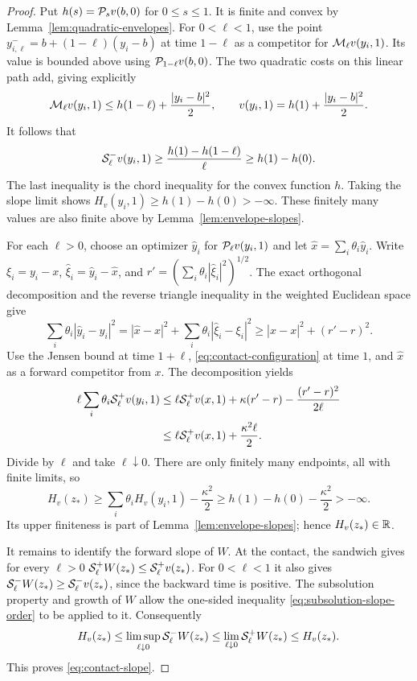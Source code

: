 \begin{proof}
Put $h(s)=\mathcal{P}_s v(b,0)$ for $0\le s\le1$. It is finite and
convex by Lemma~\ref{lem:quadratic-envelopes}. For
$0<\ell<1$, use the point
$y_{i,\ell}^-=b+(1-\ell)(y_i-b)$ at time $1-\ell$ as a competitor for
$\mathcal{M}_\ell v(y_i,1)$. Its value is bounded above using
$\mathcal{P}_{1-\ell}v(b,0)$. The two quadratic costs on this linear
path add, giving explicitly
\[
  \mathcal{M}_\ell v(y_i,1)
      \le h(1-\ell)+\frac{|y_i-b|^2}{2},
  \qquad
  v(y_i,1)=h(1)+\frac{|y_i-b|^2}{2}.
\]
It follows that
\[
  \mathcal{S}_\ell^-v(y_i,1)
     \ge\frac{h(1)-h(1-\ell)}{\ell}
     \ge h(1)-h(0).
\]
The last inequality is the chord inequality for the convex
function $h$. Taking the slope limit shows
$H_v(y_i,1)\ge h(1)-h(0)>-\infty$. These finitely many values
are also finite above by Lemma~\ref{lem:envelope-slopes}.

For each $\ell>0$, choose an optimizer $\widehat y_i$ for
$\mathcal{P}_\ell v(y_i,1)$ and let
$\widehat x=\sum_i\theta_i\widehat y_i$. Write
$\xi_i=y_i-x$, $\widehat\xi_i=\widehat y_i-\widehat x$, and
$r'=(\sum_i\theta_i|\widehat\xi_i|^2)^{1/2}$. The exact
orthogonal decomposition and the reverse triangle inequality
in the weighted Euclidean space give
\[
  \sum_i\theta_i|\widehat y_i-y_i|^2
    =|\widehat x-x|^2+
        \sum_i\theta_i|\widehat\xi_i-\xi_i|^2
    \ge|\widehat x-x|^2+(r'-r)^2.
\]
Use the Jensen bound at time $1+\ell$,
\eqref{eq:contact-configuration} at time $1$, and
$\widehat x$ as a forward competitor from $x$. The
decomposition yields
\begin{align*}
  \ell\sum_i\theta_i\mathcal{S}_\ell^+v(y_i,1)
   &\le \ell\mathcal{S}_\ell^+v(x,1)
       +\kappa(r'-r)-\frac{(r'-r)^2}{2\ell}\\
   &\le \ell\mathcal{S}_\ell^+v(x,1)+\frac{\kappa^2\ell}{2}.
\end{align*}
Divide by $\ell$ and take $\ell\downarrow0$. There are only
finitely many endpoints, all with finite limits, so
\[
  H_v(z_*)\ge
     \sum_i\theta_i H_v(y_i,1)-\frac{\kappa^2}{2}
     \ge h(1)-h(0)-\frac{\kappa^2}{2}>-\infty.
\]
Its upper finiteness is part of
Lemma~\ref{lem:envelope-slopes}; hence $H_v(z_*)\in\mathbb{R}$.

It remains to identify the forward slope of $W$. At the
contact, the sandwich gives for every $\ell>0$
$\mathcal{S}_\ell^+W(z_*)\le\mathcal{S}_\ell^+v(z_*)$. For
$0<\ell<1$ it also gives
$\mathcal{S}_\ell^-W(z_*)\ge\mathcal{S}_\ell^-v(z_*)$, since the
backward time is positive. The subsolution property and growth
of $W$ allow the one-sided inequality
\eqref{eq:subsolution-slope-order} to be applied to it.
Consequently
\[
  H_v(z_*)\le
  \limsup_{\ell\downarrow0}\mathcal{S}_\ell^-W(z_*)
  \le\lim_{\ell\downarrow0}\mathcal{S}_\ell^+W(z_*)
  \le H_v(z_*).
\]
This proves \eqref{eq:contact-slope}.
\end{proof}
